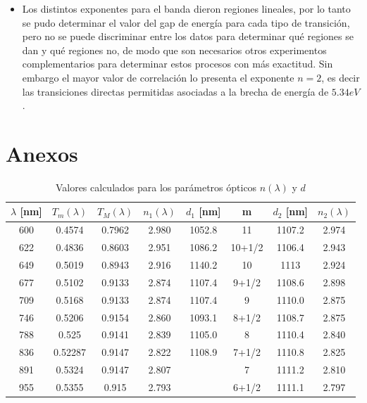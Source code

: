 \documentclass[article]{article}
\begin{document}
\begin{multicols}{2}
\begin{itemize}
            \item Los distintos exponentes para el banda dieron regiones lineales, por lo tanto se pudo determinar el valor del gap de energía para cada tipo de transición, pero no se puede discriminar entre los datos para determinar qué regiones se dan y qué regiones no, de modo que son necesarios otros experimentos complementarios para determinar estos procesos con más exactitud. Sin embargo el mayor valor de correlación lo presenta el exponente $n=2$, es decir las transiciones directas permitidas asociadas a la brecha de energía de $5.34 eV$.
            
            
            
            
        \end{itemize}
        
        
        
        
        
        
        
        
        
        
        

       
        
       

    


\end{multicols}

\newpage

\section*{Anexos}

\begin{table}[H]
    \centering
    \begin{tabular}{|c|c|c|c|c|c|c|c|}
         \hline $\lambda$ [nm] & $T_m(\lambda)$ & $T_M(\lambda)$ & $n_1(\lambda)$ & $d_1$ [nm] & m & $d_2$ [nm] & $n_2(\lambda)$  \\ \hline
         600&0.4574&0.7962&2.980&1052.8&11&1107.2&2.974\\ \hline
         622&0.4836&0.8603&2.951&1086.2&10+1/2&1106.4&2.943 \\ \hline
         649&0.5019&0.8943&2.916&1140.2&10&1113&2.924 \\ \hline
         677&0.5102&0.9133&2.874&1107.4&9+1/2&1108.6&2.898 \\ \hline
         709&0.5168&0.9133&2.874&1107.4&9&1110.0&2.875 \\ \hline
         746&0.5206&0.9154&2.860&1093.1&8+1/2&1108.7&2.875 \\ \hline
         788&0.525&0.9141&2.839&1105.0&8&1110.4&2.840 \\ \hline
         836&0.52287&0.9147&2.822&1108.9&7+1/2&1110.8&2.825 \\ \hline
         891&0.5324&0.9147&2.807&&7&1111.2&2.810 \\ \hline
         955&0.5355&0.915&2.793&&6+1/2&1111.1&2.797 \\ \hline
    \end{tabular}
    \caption{Valores calculados para los parámetros ópticos $n(\lambda)$ y $d$}
    \label{tab: Datos Refraxión y Película}
    \end{table}
    
\end{document}
